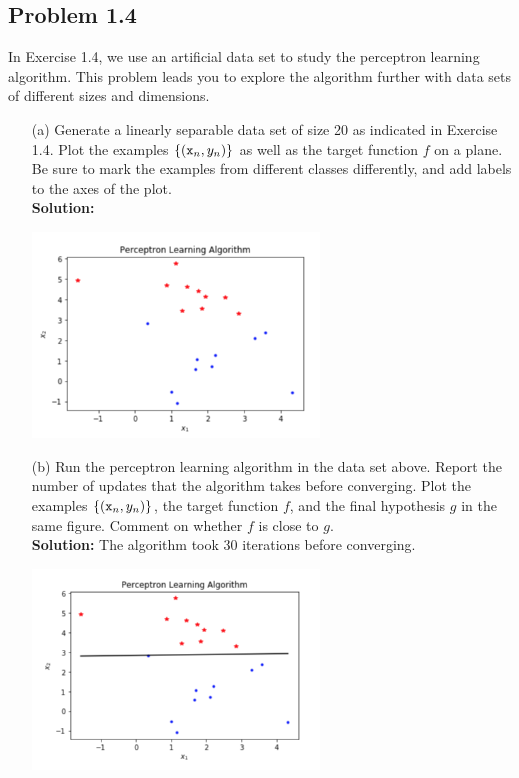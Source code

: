 \documentclass[a4paper]{article}
\begin{document}
\subsection{Problem 1.4} In Exercise 1.4, we use an artificial data set to study the perceptron 
learning algorithm.  This problem leads you to explore the algorithm further with data sets of 
different sizes and dimensions.
\begin{itemize}
    \item[(a)] Generate a linearly separable data set of size 20 as indicated in Exercise 1.4.  
    Plot the examples $\{(\verb|x|_n, y_n)\}$ as well as the target function $f$ on a plane.  
    Be sure to mark the examples from different classes differently, and add labels to the axes 
    of the plot.\\
    \textbf{Solution:}
    \begin{center}
        \includegraphics[width=0.6\textwidth]{1-4-a.jpg}
    \end{center}
    \item[(b)] Run the perceptron learning algorithm in the data set above.  Report the number 
    of updates that the algorithm takes before converging.  Plot the examples $\{(\verb|x|_n, y_n)\}$, 
    the target function $f$, and the final hypothesis $g$ in the same figure.  Comment on whether 
    $f$ is close to $g$.\\
    \textbf{Solution:} The algorithm took 30 iterations before converging.
    \begin{center}
        \includegraphics[width=0.6\textwidth]{1-4-b.jpg}

\end{center}
\end{itemize}
\end{document}
